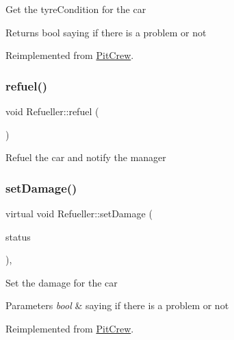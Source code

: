 Get the tyre\+Condition for the car \begin{DoxyReturn}{Returns}
bool saying if there is a problem or not 
\end{DoxyReturn}


Reimplemented from \mbox{\hyperlink{class_pit_crew_a7a527a6b4eccb6570dcad04b04dc1177}{Pit\+Crew}}.

\mbox{\label{class_refueller_a92e905b0ad944ff18ee9689eb0d39c95}} 
\subsubsection{\texorpdfstring{refuel()}{refuel()}}
{\footnotesize\ttfamily void Refueller\+::refuel (\begin{DoxyParamCaption}{ }\end{DoxyParamCaption})\hspace{0.3cm}{\ttfamily [inline]}}

Refuel the car and notify the manager \mbox{\label{class_refueller_a0b40ac4e5bd3c83e2a0cfd18214c849d}} 
\subsubsection{\texorpdfstring{set\+Damage()}{setDamage()}}
{\footnotesize\ttfamily virtual void Refueller\+::set\+Damage (\begin{DoxyParamCaption}\item[{bool}]{status }\end{DoxyParamCaption})\hspace{0.3cm}{\ttfamily [inline]}, {\ttfamily [virtual]}}

Set the damage for the car 
\begin{DoxyParams}{Parameters}
{\em bool} & saying if there is a problem or not \\
\hline
\end{DoxyParams}


Reimplemented from \mbox{\hyperlink{class_pit_crew_a41051dd7081efeac022cc3a35a592c64}{Pit\+Crew}}.

\mbox{\label{class_refueller_a8b8eb7429509e858a3787e1a58aa9db0}} 

